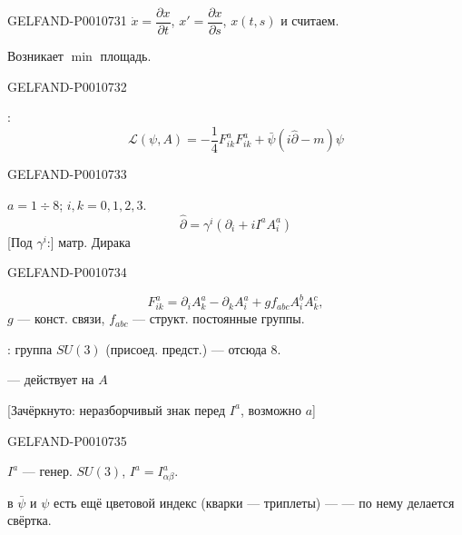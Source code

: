 \begin{GelfandAdjacentEvidence}{GELFAND-P001073}{1}
$\dot x=\dfrac{\partial x}{\partial t}$, $x'=\dfrac{\partial x}{\partial s}$, $x(t,s)$ и считаем.

Возникает $\min$ площадь.
\end{GelfandAdjacentEvidence}
\begin{GelfandAdjacentEvidence}{GELFAND-P001073}{2}



:
\begin{equation*}
\mathcal L(\psi,A)=-\frac14F_{ik}^aF_{ik}^a+\bar\psi(i\hat\partial-m)\psi
\tag{22}
\end{equation*}
\end{GelfandAdjacentEvidence}
\begin{GelfandAdjacentEvidence}{GELFAND-P001073}{3}


$a=1\div8$; $i,k=0,1,2,3$.
\begin{equation*}
\hat\partial=\gamma^i(\partial_i+iI^aA_i^a)
\tag{23}
\end{equation*}
[Под $\gamma^i$:] матр. Дирака
\end{GelfandAdjacentEvidence}
\begin{GelfandAdjacentEvidence}{GELFAND-P001073}{4}

\begin{equation*}
F_{ik}^a=\partial_i A_k^a-\partial_k A_i^a+g f_{abc}A_i^bA_k^c,
\tag{24}
\end{equation*}
$g$ — конст. связи, $f_{abc}$ — структ. постоянные группы.

: группа $SU(3)$ (присоед. предст.) — отсюда 8.

— действует на $A$

[Зачёркнуто: неразборчивый знак перед \(I^a\), возможно \(a\)]
\end{GelfandAdjacentEvidence}
\begin{GelfandAdjacentEvidence}{GELFAND-P001073}{5}


$I^a$ — генер. $SU(3)$, $I^a=I^a_{\alpha\beta}$.

в $\bar\psi$ и $\psi$ есть ещё цветовой индекс (кварки — триплеты) — — по нему делается свёртка.
\end{GelfandAdjacentEvidence}
